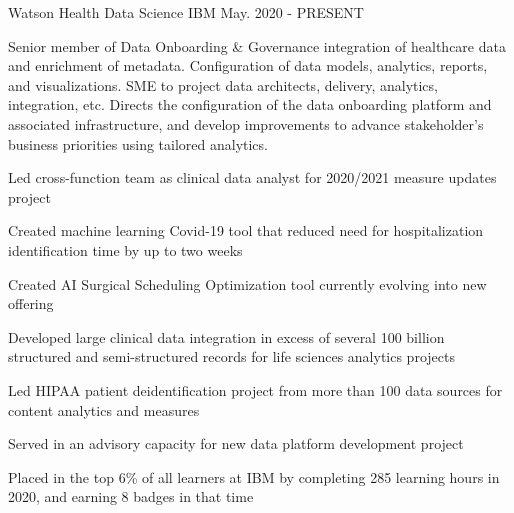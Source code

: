 

\begin{cventries}

  \cventry
    {Watson Health} %
    {Data Science} %
    {IBM} %
    {May. 2020 - PRESENT} %
    {
      \begin{cvparagraph}
        Senior member of Data Onboarding \& Governance integration of healthcare data and enrichment of metadata. Configuration of data models, analytics, reports, and visualizations. SME to project data architects, delivery, analytics, integration, etc. Directs the configuration of the data onboarding platform and associated infrastructure, and develop improvements to advance stakeholder’s business priorities using tailored analytics.
      \end{cvparagraph}
      \begin{cvitems} %
        \item {Led cross-function team as clinical data analyst for 2020/2021 measure updates project}
        \item {Created machine learning Covid-19 tool that reduced need for hospitalization identification time by up to two weeks}
        \item {Created AI Surgical Scheduling Optimization tool currently evolving into new offering}
        \item {Developed large clinical data integration in excess of several 100 billion structured and semi-structured records for life sciences analytics projects}
        \item {Led HIPAA patient deidentification project from more than 100 data sources for content analytics and measures}
        \item {Served in an advisory capacity for new data platform development project}
        \item {Placed in the top 6\% of all learners at IBM by completing 285 learning hours in 2020, and earning 8 badges in that time}
      \end{cvitems}
    }


\end{cventries}
